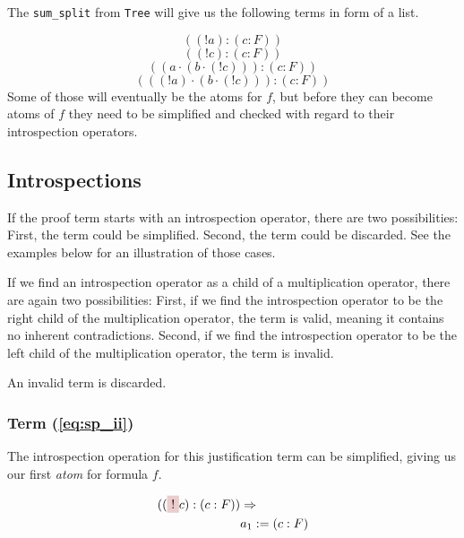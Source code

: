 

The \texttt{sum\_split} from \texttt{Tree} will give us the following terms in form of a list. 

\begin{equation}\label{eq:sp_i}	
	((!a):(c:F))
\end{equation}
\begin{equation}\label{eq:sp_ii}	
	((!c):(c:F))
\end{equation}	
\begin{equation}\label{eq:sp_iii}	
	((a \cdot(b\cdot (! c))):(c:F))											
\end{equation}
\begin{equation}\label{eq:sp_iv}	
	(((! a)\cdot(b\cdot (! c))):(c:F))												
\end{equation}
Some of those will eventually be the atoms for $f$, but before they can become atoms of $f$ they need to be simplified and checked with regard to their introspection operators.

\subsection{Introspections}
If the proof term starts with an introspection operator, there are two possibilities: First, the term could be simplified. Second, the term could be discarded. See the examples below for an illustration of those cases. 

If we find an introspection operator as a child of a multiplication operator, there are again two possibilities: First, if we find the introspection operator to be the right child of the multiplication operator, the term is valid, meaning it contains no inherent contradictions. Second, if we find the introspection operator to be the left child of the multiplication operator, the term is invalid. 

An invalid term is discarded.

\subsubsection[First term]{Term (\ref{eq:sp_ii})}
The introspection operation for this justification term can be simplified, giving us our first \emph{atom} for formula $f.$

\begin{equation}\label{eq:a_1}
	\begin{split}
	((\tikz[baseline]{\node[fill=red!20,anchor=base] (t1){$!$};} c):(c:F)) & \Rightarrow \\
	& a_1 := (c:F)
	\end{split}
\end{equation}

